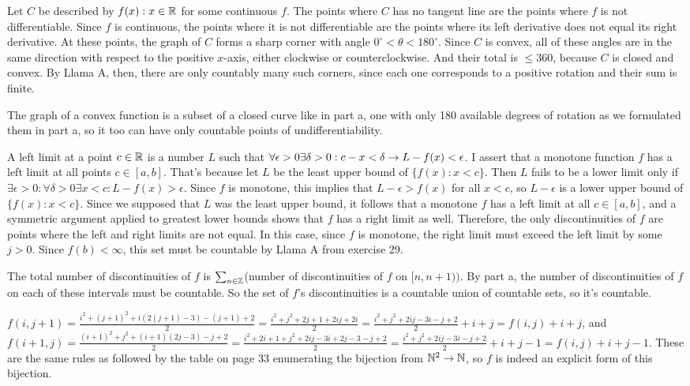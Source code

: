 \documentclass[11pt, oneside]{article}   	%
\begin{document}
Let $C$ be described by $f(x): x \in \mathbb{R}$ for some continuous $f$. The points where $C$ has no tangent line are the points where $f$ is not differentiable. Since $f$ is continuous, the points where it is not differentiable are the points where its left derivative does not equal its right derivative. At these points, the graph of $C$ forms a sharp corner with angle $0^\circ < \theta < 180^\circ$. Since $C$ is convex, all of these angles are in the same direction with respect to the positive $x$-axis, either clockwise or counterclockwise. And their total is $\le 360$, because $C$ is closed and convex. By Llama A, then, there are only countably many such corners, since each one corresponds to a positive rotation and their sum is finite.
\item The graph of a convex function is a subset of a closed curve like in part a, one with only 180 available degrees of rotation as we formulated them in part a, so it too can have only countable points of undifferentiability.
\ee
\item \be
\item A left limit at a point $c \in \mathbb{R}$ is a number $L$ such that $\forall \epsilon > 0 \exists \delta > 0 : c - x < \delta \rightarrow L-f(x) < \epsilon$. I assert that a monotone function $f$ has a left limit at all points $c \in [a, b]$. That's because let $L$ be the least upper bound of $\{f(x) : x < c\}$. Then $L$ fails to be a lower limit only if $\exists \epsilon > 0 : \forall \delta > 0 \exists x < c: L - f(x) > \epsilon$. Since $f$ is monotone, this implies that $L - \epsilon > f(x)$ for all $x < c$, so $L - \epsilon$ is a lower upper bound of $\{f(x): x < c\}$. Since we supposed that $L$ was the least upper bound, it follows that a monotone $f$ has a left limit at all $c \in [a, b]$, and a symmetric argument applied to greatest lower bounds shows that $f$ has a right limit as well. Therefore, the only discontinuities of $f$ are points where the left and right limits are not equal. In this case, since $f$ is monotone, the right limit must exceed the left limit by some $j > 0$. Since $f(b) < \infty$, this set must be countable by Llama A from exercise 29. 
\item The total number of discontinuities of $f$ is $\sum_{n \in \mathbb{Z}}$(number of discontinuities of $f$ on $[n, n + 1))$. By part a, the number of discontinuities of $f$ on each of these intervals must be countable. So the set of $f$'s discontinuities is a countable union of countable sets, so it's countable.
\ee
\item $f(i, j+1) = \frac{i^2 + (j + 1)^2 + i(2(j+1) - 3) - (j + 1) + 2}{2} = \frac{i^2 + j^2 + 2j + 1 + 2ij + 2i}{2} = \frac{i^2 + j^2 + 2ij - 3i - j + 2}{2} + i + j = f(i, j) + i + j$, and $f(i + 1, j) = \frac{(i + 1)^2 + j^2 + (i + 1)(2j - 3) - j + 2}{2} = \frac{i^2 + 2i + 1 + j^2 + 2ij - 3i + 2j - 3 - j + 2}{2} = \frac{i^2 + j^2 + 2ij - 3i - j + 2}{2} + i + j - 1 = f(i, j) + i + j  -1$. These are the same rules as followed by the table on page 33 enumerating the bijection from $\mathbb{N}^2 \to \mathbb{N}$, so $f$ is indeed an explicit form of this bijection.
\end{document}
